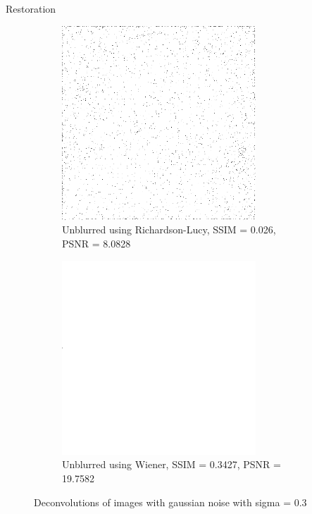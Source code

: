 \documentclass[aspectratio=1610]{beamer}
\begin{document}
\begin{frame}{Restoration}
  \begin{figure}
    \centering
    \begin{subfigure}[t]{0.4\textwidth}
        \includegraphics[width=0.8\textwidth]{images/unblurred_rl_high_noise.png}
        \caption{Unblurred using Richardson-Lucy, \break SSIM = 0.026, PSNR = 8.0828}
        \label{fig:restored5}
    \end{subfigure}
    \begin{subfigure}[t]{0.4\textwidth}
        \includegraphics[width=0.8\textwidth]{images/unblurred_w_high_noise.png}
        \caption{Unblurred using Wiener, \break SSIM = 0.3427, PSNR = 19.7582}
        \label{fig:restored6}
    \end{subfigure}
    \caption{Deconvolutions of images with gaussian noise with sigma = 0.3}
  \end{figure}
\end{frame}
\end{document}
